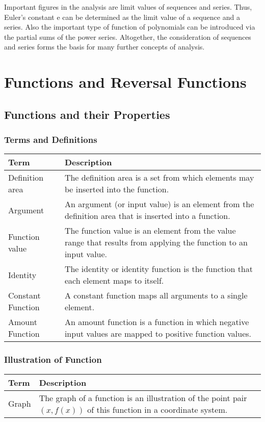 \documentclass{book}
\begin{document}
Important figures in the analysis are limit values of sequences and series. Thus, Euler's constant e can be determined as the limit value of a sequence and a series. Also the important type of function of polynomials can be introduced via the partial sums of the power series. Altogether, the consideration of sequences and series forms the basis for many further concepts of analysis.

\chapter{Functions and Reversal Functions}
\section{Functions and their Properties}
\subsection{Terms and Definitions}
\begin{tabular}{p{3cm}p{10.5cm}}
  \toprule
  \textbf{Term} & \textbf{Description} \\
  \midrule
  Definition area & The definition area is a set from which elements may be inserted into the function.\\
  \midrule
  Argument & An argument (or input value) is an element from the definition area that is inserted into a function.\\
  \midrule
  Function value & The function value is an element from the value range that results from applying the function to an input value.\\
  \midrule
  Identity & The identity or identity function is the function that each element maps to itself.\\
  \midrule
  Constant Function & A constant function maps all arguments to a single element.\\ 
  \midrule
  Amount Function & An amount function is a function in which negative input values are mapped to positive function values.\\
  \bottomrule
\end{tabular}

\subsection{Illustration of Function}
\begin{tabular}{p{3cm}p{10.5cm}}
  \toprule
  \textbf{Term} & \textbf{Description} \\
  \midrule
  Graph & The graph of a function is an illustration of the point pair $(x, f(x))$ of this function in a coordinate system.\\
  \bottomrule
\end{tabular}
\end{document}
